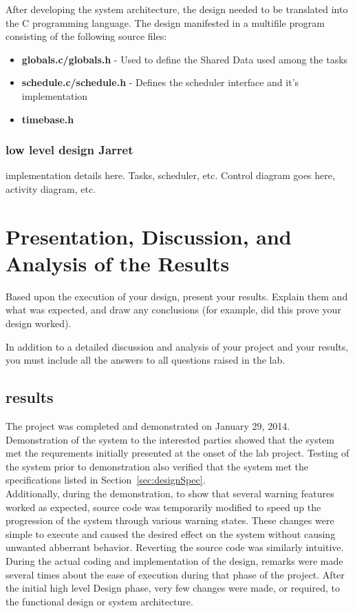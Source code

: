\documentclass[12pt]{article} %
\begin{document}
After developing the system architecture, the design needed to be translated into the C programming language.  The design manifested in a multifile program consisting of the following source files:
\begin{itemize}
  \item \textbf{globals.c/globals.h} - Used to define the Shared Data used among the tasks
  \item \textbf{schedule.c/schedule.h} - Defines the scheduler interface and it's implementation
  \item \textbf{timebase.h}
\end{itemize}

\subsubsection{low level design  Jarret}

implementation details here. Tasks, scheduler, etc. Control diagram goes here, activity diagram, etc.

\section{Presentation, Discussion, and Analysis of the Results}

Based upon the execution of your design, present your results. Explain them and what was expected, and draw any conclusions (for example, did this prove your design worked).

In addition to a detailed discussion and analysis of your project and your results, you must include all the answers to all questions raised in the lab.
\subsection{results}
The project was completed and demonstrated on January 29, 2014. \\

Demonstration of the system to the interested parties showed that the system met the requrements initially presented at the onset of the lab project.
Testing of the system prior to demonstration also verified that the system met the specifications listed in Section~\ref{sec:designSpec}. \\
Additionally, during the demonstration, to show that several warning features worked as expected, source code was temporarily modified to speed up the progression of the system through various warning states. These changes were simple to execute and caused the desired effect on the system without causing unwanted abberrant behavior. Reverting the source code was similarly intuitive.
During the actual coding and implementation of the design, remarks were made several times about the ease of execution during that phase of the project. After the initial high level Design phase, very few changes were made, or required, to the functional design or system architecture.\\
\end{document}
